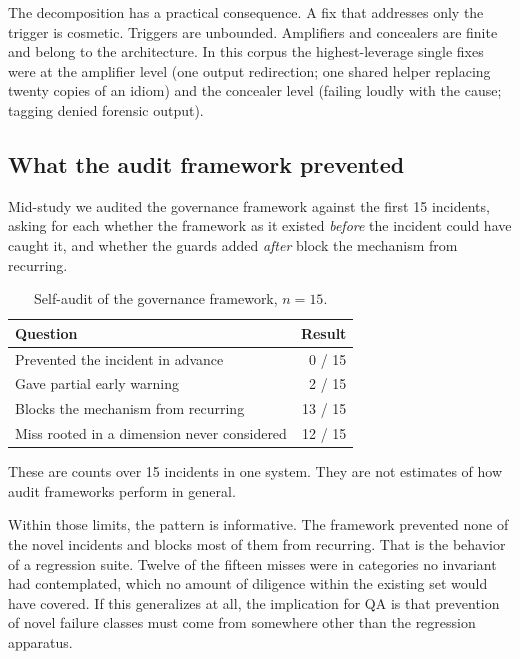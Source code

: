 \documentclass[conference]{IEEEtran}
\begin{document}
The decomposition has a practical consequence. A fix that addresses only the
trigger is cosmetic. Triggers are unbounded. Amplifiers and concealers are
finite and belong to the architecture. In this corpus the highest-leverage
single fixes were at the amplifier level (one output redirection; one shared
helper replacing twenty copies of an idiom) and the concealer level (failing
loudly with the cause; tagging denied forensic output).

\subsection{What the audit framework prevented}
\label{sec:selfaudit}

Mid-study we audited the governance framework against the first 15
incidents, asking for each whether the framework as it existed \emph{before}
the incident could have caught it, and whether the guards added \emph{after}
block the mechanism from recurring.

\begin{table}[t]
\caption{Self-audit of the governance framework, $n = 15$.}
\label{tab:selfaudit}
\centering
\footnotesize
\begin{tabular}{@{}l r@{}}
\toprule
Question & Result \\
\midrule
Prevented the incident in advance & 0 / 15 \\
Gave partial early warning & 2 / 15 \\
Blocks the mechanism from recurring & 13 / 15 \\
Miss rooted in a dimension never considered & 12 / 15 \\
\bottomrule
\end{tabular}
\end{table}

These are counts over 15 incidents in one system. They are not estimates of
how audit frameworks perform in general.

Within those limits, the pattern is informative. The framework prevented
none of the novel incidents and blocks most of them from recurring. That is
the behavior of a regression suite. Twelve of the fifteen misses were in
categories no invariant had contemplated, which no amount of diligence
within the existing set would have covered. If this generalizes at all, the
implication for QA is that prevention of novel failure classes must come
from somewhere other than the regression apparatus.

\end{document}

